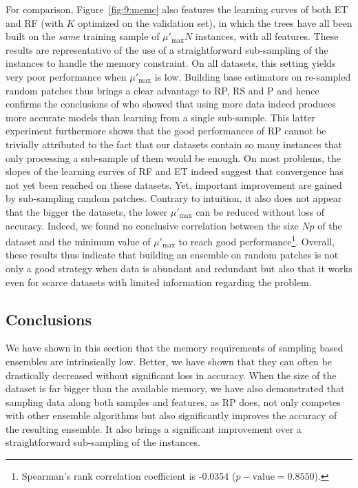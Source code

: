 For comparison, Figure~\ref{fig:9:memc} also features the learning curves of both
ET and RF (with $K$ optimized on the validation set), in which the trees have
all been built on the {\it same} training sample of $\mu'_{\text{max}}N$ instances,
with all features. These results are representative of the use of a
straightforward sub-sampling of the instances to handle the memory constraint.
On all datasets, this setting yields very poor performance when $\mu'_{\text{max}}$ is
low. Building base estimators on re-sampled random patches thus brings a clear advantage to RP, RS and P and hence confirms the conclusions of \citet{basilico:2011} who showed that using more data indeed produces
more accurate models than learning from a single sub-sample.
This
latter experiment furthermore shows that the good performances of RP
cannot be trivially attributed to the fact that our datasets contain so many
instances that only processing a sub-sample of them would be enough. On most
problems, the slopes of the learning curves of RF and ET indeed suggest that
convergence has not yet been reached on these datasets. Yet, important
improvement are gained by sub-sampling random patches.
Contrary to intuition, it
also does not appear that the bigger the datasets, the lower $\mu'_{\text{max}}$ can be
reduced without loss of accuracy. Indeed, we found no conclusive correlation
between the size $Np$ of the dataset and the minimum value of $\mu'_{\text{max}}$ to
reach good performance\footnote{Spearman's rank correlation coefficient is
-0.0354 ($p-\mathrm{value}=0.8550$).}.
Overall, these results thus indicate that
building an ensemble on random patches is not only a good strategy when data is
abundant and redundant but also that it works even for scarce datasets with
limited information regarding the problem.

\subsection{Conclusions}

We have shown in this section that the memory requirements of sampling based
ensembles are intrinsically low. Better, we have shown that they can often be
drastically decreased without significant loss in accuracy. When the size of the
dataset is far bigger than the available memory, we have also demonstrated that
sampling data along both samples and features, as RP does, not only competes
with other ensemble algorithms but also significantly improves the accuracy of
the resulting ensemble. It also brings a significant improvement over a
straightforward sub-sampling of the instances.

